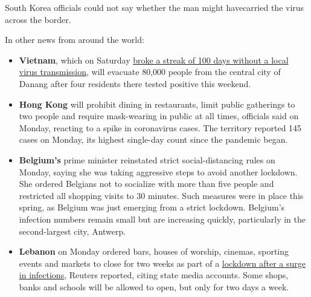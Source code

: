 South Korea officials could not say whether the man might have ​carried
the virus across the border.

In other news from around the world:

\begin{itemize}
\item
  \textbf{Vietnam}, which on Saturday
  \href{https://www.nytimes3xbfgragh.onion/2020/07/25/world/asia/coronavirus-vietnam.html}{broke
  a streak of 100 days without a local virus transmission}, will
  evacuate 80,000 people from the central city of Danang after four
  residents there tested positive this weekend.
\item
  \textbf{Hong Kong} will prohibit dining in restaurants, limit public
  gatherings to two people and require mask-wearing in public at all
  times, officials said on Monday, reacting to a spike in coronavirus
  cases. The territory reported 145 cases on Monday, its highest
  single-day count since the pandemic began.
\item
  \textbf{Belgium's} prime minister reinstated strict social-distancing
  rules on Monday, saying she was taking aggressive steps to avoid
  another lockdown. She ordered Belgians not to socialize with more than
  five people and restricted all shopping visits to 30 minutes. Such
  measures were in place this spring, as Belgium was just emerging from
  a strict lockdown. Belgium's infection numbers remain small but are
  increasing quickly, particularly in the second-largest city, Antwerp.
\end{itemize}

\begin{itemize}
\tightlist
\item
  \textbf{Lebanon} on Monday ordered bars, houses of worship, cinemas,
  sporting events and markets to close for two weeks as part of a
  \href{https://www.reuters.com/article/us-health-coronavirus-lebanon/lebanon-reimposes-covid-19-restrictions-as-infections-spike-idUSKCN24S2FV?il=0}{lockdown
  after a surge in infections}, Reuters reported, citing state media
  accounts. Some shops, banks and schools will be allowed to open, but
  only for two days a week.
\end{itemize}

